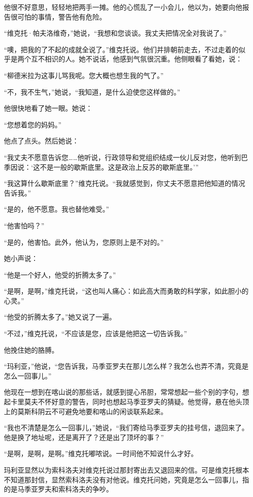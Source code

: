 他很不好意思，轻轻地把两手一摊。他的心慌乱了一小会儿，他以为，她要向他报告很可怕的事情，警告他有危险。

“维克托·帕夫洛维奇，”她说，“我想和您谈谈。我丈夫把情况全对我说了。”

“噢，把我的了不起的成就全说了。”维克托说。他们并排朝前走去，不过走着的似乎是两个互不相识的人。她不说话，他感到气氛很沉重。他侧眼看了看她，说：

“柳德米拉为这事儿骂我呢。您大概也想生我的气了。”

“不，我不生气，”她说，“我知道，是什么迫使您这样做的。”

他很快地看了她一眼。她说：

“您想着您的妈妈。”

他点了点头。然后她说：

“我丈夫不愿意告诉您……他听说，行政领导和党组织结成一伙儿反对您，他听到巴季因说：‘这不是一般的歇斯底里。这是政治上反苏的歇斯底里。’”

“我这算什么歇斯底里？”维克托说。“我就感觉到，你丈夫不愿意把他知道的情况告诉我。”

“是的，他不愿意。我也替他难受。”

“他害怕吗？”

“是的，他害怕。此外，他认为，您原则上是不对的。”

她小声说：

“他是一个好人，他受的折腾太多了。”

“是啊，是啊，”维克托说，“这也叫人痛心：如此高大而勇敢的科学家，如此胆小的心灵。”

“他受的折腾太多了。”她又说了一遍。

“不过，”维克托说，“不应该是您，应该是他把这一切告诉我。”

他挽住她的胳膊。

“玛利亚，”他说，“您告诉我，马季亚罗夫在那儿怎么样？我怎么也弄不清，究竟是怎么一回事儿。”

他现在一想到在喀山说的那些话，就感到提心吊胆，常常想起一些个别的字句，想起卡里莫夫不怀好意的警告，同时也想起马季亚罗夫的猜疑。他觉得，悬在他头顶上的莫斯科阴云不可避免地要和喀山的闲谈联系起来。

“我也不清楚是怎么一回事儿，”她说，“我们寄给马季亚罗夫的挂号信，退回来了。他是换了地址呢，还是离开了？还是出了顶坏的事？”

“是啊，是啊，是啊。”维克托嘟哝说。一时间他不知说什么才好。

玛利亚显然以为索科洛夫对维克托说过那封寄出去又退回来的信。可是维克托根本不知道那封信，显然索科洛夫没有对他说。维克托问她，究竟是怎么一回事儿，指的是马季亚罗夫和索科洛夫的争吵。


